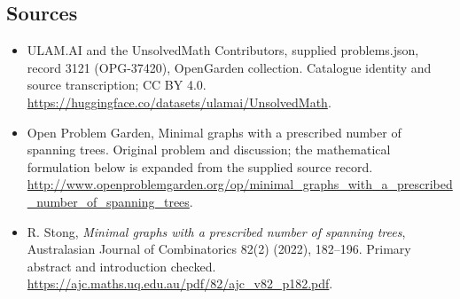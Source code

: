 \documentclass[11pt,a4paper]{article}
\begin{document}
\subsection{Sources}
\begin{itemize}
\item[S1] ULAM.AI and the UnsolvedMath Contributors, supplied problems.json, record 3121 (OPG-37420), OpenGarden collection. Catalogue identity and source transcription; CC BY 4.0.
\url{https://huggingface.co/datasets/ulamai/UnsolvedMath}.
\item[S2] Open Problem Garden, Minimal graphs with a prescribed number of spanning trees. Original problem and discussion; the mathematical formulation below is expanded from the supplied source record.
\url{http://www.openproblemgarden.org/op/minimal_graphs_with_a_prescribed_number_of_spanning_trees}.
\item[R1] R. Stong, \emph{Minimal graphs with a prescribed number of spanning trees}, Australasian Journal of Combinatorics 82(2) (2022), 182--196. Primary abstract and introduction checked.
\url{https://ajc.maths.uq.edu.au/pdf/82/ajc_v82_p182.pdf}.
\end{itemize}
\end{document}
